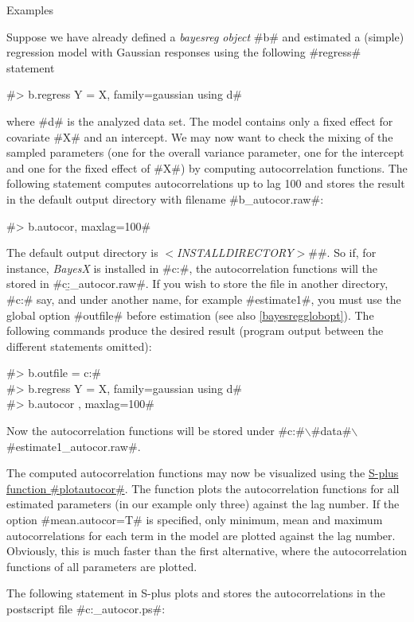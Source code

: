 \begin{stanza}{Examples}

Suppose we have already defined a {\em bayesreg object} #b# and
estimated a (simple) regression model with Gaussian responses
using the following #regress# statement

#> b.regress Y = X, family=gaussian using d#

where #d# is the analyzed data set. The model contains only a
fixed effect for covariate #X# and an intercept. We may now want
to check the mixing of the sampled parameters (one for the overall
variance parameter, one for the intercept and one for the fixed
effect of #X#) by computing autocorrelation functions. The
following statement computes autocorrelations up to lag 100 and
stores the result in the default output directory with filename
#b_autocor.raw#:

#> b.autocor, maxlag=100#

The default output directory is
{\em$<$INSTALLDIRECTORY$>$}#\output#. So if, for instance, {\em
BayesX} is installed in #c:\bayes#, the autocorrelation functions
will the stored in #c:\bayes\output\b_autocor.raw#. If you wish to
store the file in another directory, #c:\data# say, and under
another name, for example #estimate1#, you must use the global
option #outfile# before estimation (see also
\autoref{bayesregglobopt}). The following commands produce the
desired result (program output between the different statements
omitted):

#> b.outfile = c:\data{}# \\
#> b.regress Y = X, family=gaussian using d# \\
#> b.autocor , maxlag=100#

Now the autocorrelation functions will be stored under
#c:#$\backslash$#data#$\backslash$#estimate1_autocor.raw#.

The computed autocorrelation functions may now be visualized using
the \hyperref[splusplotautocor]{S-plus function #plotautocor#}.
The function plots the autocorrelation functions for all estimated
parameters (in our example only three) against the lag number. If
the option #mean.autocor=T# is specified, only minimum, mean and
maximum autocorrelations for each term in the model are plotted
against the lag number. Obviously, this is much faster than the
first alternative, where the autocorrelation functions of all
parameters are plotted.

The following statement in S-plus plots and stores the
autocorrelations in the postscript file
#c:\data{}_autocor.ps#:


\end{stanza}
